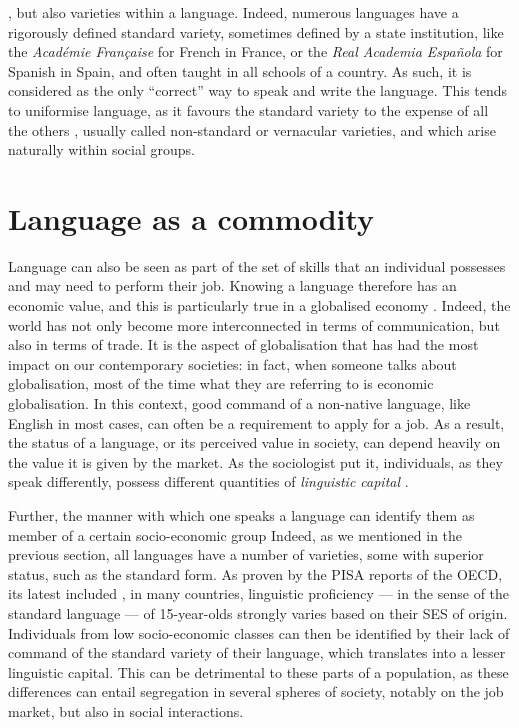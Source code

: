 \documentclass[../thesis.tex]{subfiles}
\begin{document}
\cite{GalMultilingualism2006,RomaineBilingualMultilingual2012,FasoldSociolinguisticsSociety1984},
but also varieties within a language. Indeed, numerous languages have a rigorously
defined standard variety, sometimes defined by a state institution, like the
\textit{Académie Française} for French in France, or the \textit{Real Academia Española}
for Spanish in Spain, and often taught in all schools of a country. As such, it is
considered as the only ``correct'' way to speak and write the language. This tends to
uniformise language, as it favours the standard variety to the expense of all the others
\cite{MilroyIdeologyStandard2006,DavilaInevitabilityStandard2016}, usually called
non-standard or vernacular varieties, and which arise naturally within social groups.


\section{Language as a commodity}
\label{sec:lang_as_commodity}
Language can also be seen as part of the set of skills that an individual possesses and
may need to perform their job. Knowing a language therefore has an economic value, and
this is particularly true in a globalised economy
\cite{HellerCommodificationLanguage2010}. Indeed, the world has not only become more
interconnected in terms of communication, but also in terms of trade. It is the aspect
of globalisation that has had the most impact on our contemporary societies: in fact,
when someone talks about globalisation, most of the time what they are referring to is
economic globalisation. In this context, good command of a non-native language, like
English in most cases, can often be a requirement to apply for a job. As a result, the
status of a language, or its perceived value in society, can depend heavily on the value
it is given by the market. As the sociologist
 put it, individuals, as they speak
differently, possess different quantities of \emph{linguistic capital}
\cite{BourdieuLanguageSymbolic2009}.

Further, the manner with which one speaks a language can identify them as member of a
certain socio-economic group Indeed, as we mentioned in the previous section, all
languages have a number of varieties, some with superior status, such as the standard
form. As proven by the PISA reports of the OECD, its latest included
\cite{OECDWhereAll2019}, in many countries, linguistic proficiency --- in the sense of
the standard language --- of 15-year-olds strongly varies based on their \ac{SES} of
origin. Individuals from low socio-economic classes can then be identified by their lack
of command of the standard variety of their language, which translates into a lesser
linguistic capital. This can be detrimental to these parts of a population, as these
differences can entail segregation in several spheres of society, notably on the job
market, but also in social interactions. 
\end{document}
